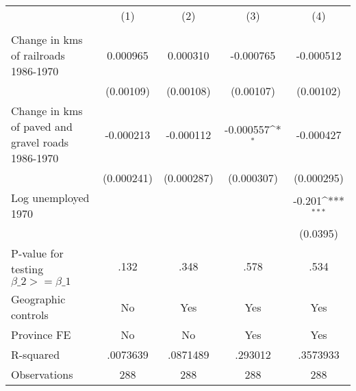 {
\def\sym#1{\ifmmode^{#1}\else\(^{#1}\)\fi}
\begin{tabular}{l*{4}{c}}
\hline\hline
                &\multicolumn{1}{c}{(1)}&\multicolumn{1}{c}{(2)}&\multicolumn{1}{c}{(3)}&\multicolumn{1}{c}{(4)}\\
                &\multicolumn{1}{c}{}&\multicolumn{1}{c}{}&\multicolumn{1}{c}{}&\multicolumn{1}{c}{}\\
\hline
Change in kms of railroads 1986-1970& 0.000965         & 0.000310         &-0.000765         &-0.000512         \\
                &(0.00109)         &(0.00108)         &(0.00107)         &(0.00102)         \\
[1em]
Change in kms of paved and gravel roads 1986-1970&-0.000213         &-0.000112         &-0.000557\sym{*}  &-0.000427         \\
                &(0.000241)         &(0.000287)         &(0.000307)         &(0.000295)         \\
[1em]
Log unemployed 1970&                  &                  &                  &   -0.201\sym{***}\\
                &                  &                  &                  & (0.0395)         \\
\hline
P-value for testing $\beta\_{2} >= \beta\_{1}$&     .132         &     .348         &     .578         &     .534         \\
Geographic controls&       No         &      Yes         &      Yes         &      Yes         \\
Province FE     &       No         &       No         &      Yes         &      Yes         \\
R-squared       & .0073639         & .0871489         &  .293012         & .3573933         \\
Observations    &      288         &      288         &      288         &      288         \\
\hline\hline
\end{tabular}
}

